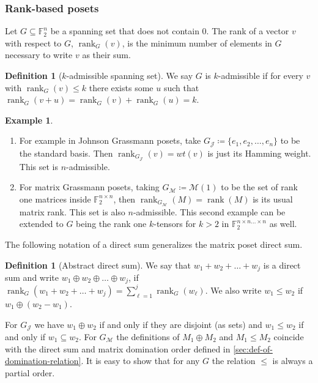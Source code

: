 \documentclass[10pt,a4paper]{article}
\newcommand{\prettyref}[1]{\cref{#1}}
\theoremstyle{definition}
\newtheorem{definition}[theorem]{Definition}
\newtheorem{example}[theorem]{Example}
\theoremstyle{remark}
\newcommand{\set}[1]{\{#1\}}
\def\sp{\mathrm{ span}}
\newcommand{\F}{\mathbb{F}}
\DeclareMathOperator{\rank}{rank}
\renewcommand{\leq}{\leqslant}
\numberwithin{equation}{section}
\let\pref=\prettyref
\def\MP{\mathcal{M}}
\begin{document}
\subsubsection{Rank-based posets}
Let \(G \subseteq \F_2^n\) be a spanning set that does not contain \(0\). The rank of a vector \(v\) with respect to \(G\), \(\rank_G(v)\), is the minimum number of elements in \(G\) necessary to write \(v\) as their sum. %
\begin{definition}[\(k\)-admissible spanning set]
We say \(G\) is \(k\)-admissible if for every \(v\) with \(\rank_G(v) \leq k\) there exists some \(u\) such that \(\rank_G(v+u) =\rank_G(v)+\rank_G(u) =k\).
\end{definition}

\begin{example}
\begin{enumerate}
    \item For example in Johnson Grassmann posets, take \(G_{\mathcal{J}} \coloneqq \set{e_1,e_2,\dots,e_n}\) to be the standard basis. Then \(\rank_{G_{\mathcal{J}}}(v)=wt(v)\) is just its Hamming weight. This set is \(n\)-admissible. 
    \item For matrix Grassmann posets, taking \(G_{\MP}\coloneqq \MP(1)\) to be the set of rank one matrices inside \(\F_2^{n \times n}\), then \(\rank_{G_{\MP}}(M) = \rank(M)\) is its usual matrix rank. This set is also \(n\)-admissible. This second example can be extended to \(G\) being the rank one \(k\)-tensors for \(k > 2\) in \(\F_2^{n\times n \dots \times n}\) as well. 
\end{enumerate}    
\end{example}

The following notation of a direct sum generalizes the matrix poset direct sum.
\begin{definition}[Abstract direct sum]
    We say that \(w_1+w_2+\dots+w_j\) is a direct sum and write \(w_1\oplus w_2 \oplus \dots \oplus w_j\), if \(\rank_G(w_1 + w_2 + \dots +w_j) = \sum_{\ell=1}^j \rank_G(w_\ell)\). We also write \(w_1 \leq w_2\) if \(w_1 \oplus (w_2-w_1)\).
\end{definition}
For \(G_{\mathcal{J}}\) we have \(w_1 \oplus w_2\) if and only if they are disjoint (as sets) and \(w_1 \leq w_2\) if and only if \(w_1 \subseteq w_2\). For \(G_{\MP}\) the definitions of \(M_1 \oplus M_2\) and \(M_1 \leq M_2\) coincide with the direct sum and matrix domination order defined in \pref{sec:def-of-domination-relation}. It is easy to show that for any \(G\) the relation \(\leq\) is always a partial order.%
\end{document}
